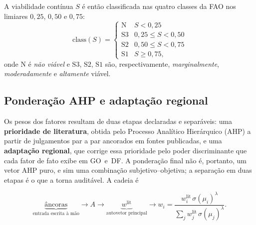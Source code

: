 A viabilidade contínua $S$ é então classificada nas quatro classes da FAO nos limiares $0{,}25$,
$0{,}50$ e $0{,}75$:
\begin{equation*}
  \text{class}(S) = \begin{cases}
   \mathrm{N}  & S < 0{,}25 \\
   \mathrm{S3} & 0{,}25 \le S < 0{,}50 \\
   \mathrm{S2} & 0{,}50 \le S < 0{,}75 \\
   \mathrm{S1} & S \ge 0{,}75,
\end{cases}
\end{equation*}
onde $\mathrm{N}$ é \emph{não viável} e $\mathrm{S3}$, $\mathrm{S2}$, $\mathrm{S1}$ são,
respectivamente, \emph{marginalmente}, \emph{moderadamente} e \emph{altamente} viável.


\subsection{Ponderação AHP e adaptação regional}\label{sec:ahp}

Os pesos dos fatores resultam de duas etapas declaradas e separáveis: uma \textbf{prioridade de
literatura}, obtida pelo Processo Analítico Hierárquico (AHP) \citep{saaty_analytic_1987} a partir
de julgamentos par a par ancorados em fontes publicadas, e uma \textbf{adaptação regional}, que
corrige essa prioridade pelo poder discriminante que cada fator de fato exibe em GO~e~DF. A
ponderação final não é, portanto, um vetor AHP puro, e sim uma combinação subjetivo--objetiva; a
separação em duas etapas é o que a torna auditável. A cadeia é

\begin{equation*}
  \underbrace{\text{âncoras}}_{\text{entrada escrita à mão}} \longrightarrow A \longrightarrow
  \underbrace{w^{\mathrm{lit}}}_{\text{autovetor principal}} \longrightarrow
  w_i = \frac{w^{\mathrm{lit}}_i \, \sigma(\mu_i)^{\lambda}}
             {\sum_j w^{\mathrm{lit}}_j \, \sigma(\mu_j)^{\lambda}} .
\end{equation*}

